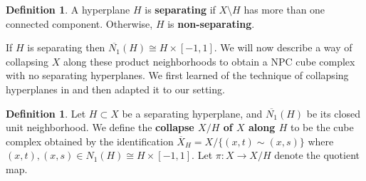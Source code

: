 \documentclass[11pt]{amsart}
\numberwithin{thm}{section}
\newtheorem{proposition}[thm]{Proposition}
\theoremstyle{remark}
\theoremstyle{definition}
\newtheorem{definition}[thm]{Definition}
\newcommand{\overl}[1]{\overline{#1}}
\begin{document}
%
%
%
%
%
%

\begin{definition}
A hyperplane $H$ is \textbf{separating} if $X\setminus H$ has more than one connected component. Otherwise, $H$ is \textbf{non-separating}. 
\end{definition}
%
%
If $H$ is separating then $\overl{N_1}(H)\cong H\times [-1,1]$.  We will now describe a way of collapsing $X$ along these product neighborhoods to obtain a NPC cube complex with no separating hyperplanes. We first learned of the technique of collapsing hyperplanes in \cite{CSV12} and then adapted it to our setting.  
%
\begin{definition} Let $H\subset X$ be a separating hyperplane, and $\overl{N_1}(H)$ be its closed unit neighborhood.  We define the \textbf{collapse $X/H$ of $X$ along $H$ }to be the cube complex obtained by the identification $\overl{X}_H=X/\{(x,t)\sim (x,s)\}$ where $(x,t), (x,s) \in N_1(H)\cong H\times [-1,1]$. Let $\pi:X\rightarrow X/H$ denote the quotient map.
\end{definition}
\end{document}
